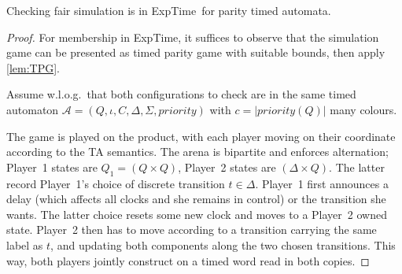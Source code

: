 \documentclass[10pt,a4paper]{amsart}
\theoremstyle{definition}
\numberwithin{equation}{section}
\newcommand{\x}{\times}
\newcommand{\card}[1]{|#1|}
\newcommand{\auta}{\mathcal{A}}
\newcommand{\states}{Q}
\newcommand{\transitions}{\Delta}
\newcommand{\clocks}{C}
\newcommand{\priority}{\mathit{priority}}
\newcommand{\EXPTIME}{{\sc ExpTime}}
\begin{document}
\begin{theorem}
    \label{lem:GFGTA:fairsim-ub}
    \label{lem:GFGTA:fairsim}
    Checking fair simulation is in \EXPTIME\ for parity timed automata.
\end{theorem}

\begin{proof}
For membership in \EXPTIME, it suffices to observe that the simulation game can be presented as timed parity game with suitable bounds, then apply \cref{lem:TPG}.

Assume w.l.o.g.\ that both configurations to check are in the same timed automaton
$\auta = (\states,\iota,\clocks,\transitions,\Sigma,\priority)$ with $c=\card{\priority(Q)}$ many colours.

The game is played on the product, with each player moving on their coordinate according to the TA semantics.
The arena is bipartite and enforces alternation; Player~1 states are $Q_1=(Q\x Q)$, Player~2 states are $(\transitions\x Q)$.
The latter record Player~1's choice of discrete transition $t\in\transitions$.
Player~1 first announces a delay (which affects all clocks and she remains in control) or the transition she wants.
The latter choice resets some new clock and moves to a Player~2 owned state. 
Player~2 then has to move according to a transition carrying the same label as $t$,
and updating both components along the two chosen transitions.
This way, both players jointly construct on a timed word read in both copies.


\end{proof}
\end{document}
